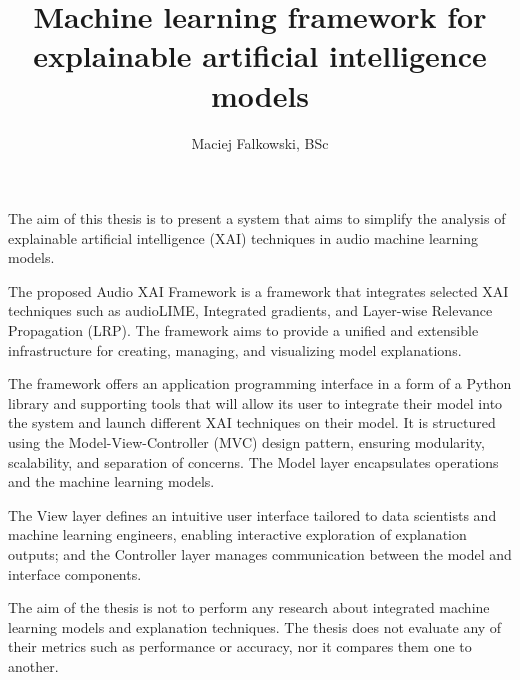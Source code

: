 \documentclass[
    bindingoffset=5mm,  %
    footnoteindent=3mm, %
    hyphenation=true    %
]{src/wut-thesis}
\begin{document}
\title{
    Machine learning framework for explainable artificial intelligence models
}
\author{Maciej Falkowski, BSc}
\date{\the\year}
\maketitle

\cleardoublepage %
\abstract
The aim of this thesis is to present a system that aims to simplify the analysis of explainable artificial
intelligence (XAI) techniques in audio machine learning models.

The proposed Audio XAI Framework is a framework that integrates selected XAI techniques such as
audioLIME, Integrated gradients, and Layer-wise Relevance Propagation (LRP). The framework aims
to provide a unified and extensible infrastructure for creating, managing, and visualizing model explanations.

The framework offers an application programming interface
in a form of a Python library and supporting tools that will allow its user
to integrate their model into the system and launch different XAI techniques on their model.
It is structured using the Model-View-Controller (MVC) design pattern, ensuring modularity,
scalability, and separation of concerns. The Model layer encapsulates operations and the machine learning
models.

The View layer defines an intuitive user interface tailored to data scientists and machine learning engineers, enabling interactive exploration of explanation outputs; and the Controller layer manages communication between the model and interface components.

The aim of the thesis is not to perform any research about integrated machine learning models and explanation
techniques. The thesis does not evaluate any of their metrics such as performance or accuracy, nor it compares them one to another.
\end{document}
